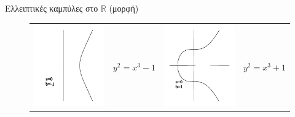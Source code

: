 \documentclass[handout]{beamer}
\begin{document}
\begin{frame}{Ελλειπτικές καμπύλες στο $\mathbb R$ (μορφή)}
\begin{figure}
\begin{tiny}
\begin{tabular}{cccc}
		\includegraphics[scale=0.25]{qaz1.png} & $y^2 = x^3 - 1 $   & \pause 
		\includegraphics[scale=0.25]{qaz2.png} &  $y^2 = x^3 + 1 $ \pause \\       

\end{tabular}
\end{tiny}
\end{figure}
\end{frame}
\end{document}

